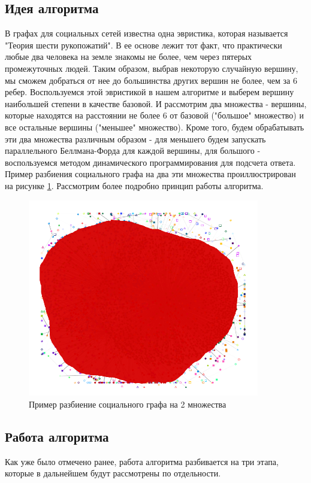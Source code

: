 \FloatBarrier
\subsection{Идея алгоритма}
В графах для социальных сетей известна одна эвристика, которая называется "Теория шести рукопожатий". В ее основе лежит тот факт, что практически любые два человека на земле знакомы не более, чем через пятерых промежуточных людей. Таким образом, выбрав некоторую случайную вершину, мы сможем добраться от нее до большинства других вершин не более, чем за 6 ребер. Воспользуемся этой эвристикой в нашем алгоритме и выберем вершину наибольшей степени в качестве базовой. И рассмотрим два множества - вершины, которые находятся на расстоянии не более 6 от базовой ("большое" множество) и все остальные вершины ("меньшее" множество). Кроме того, будем обрабатывать эти два множества различным образом - для меньшего будем запускать параллельного Беллмана-Форда для каждой вершины, для большого - воспользуемся методом динамического программирования для подсчета ответа. Пример разбиения социального графа на два эти множества проиллюстрирован на рисунке \ref{floyd_social}. Рассмотрим более подробно принцип работы алгоритма.

\begin{figure}[h]
\caption{Пример разбиение социального графа на 2 множества}
\label {floyd_social}
\centering
\includegraphics[width=0.9\textwidth]{img/floyd_social.png}
\end{figure}
\FloatBarrier

\FloatBarrier
\subsection{Работа алгоритма}
Как уже было отмечено ранее, работа алгоритма разбивается на три этапа, которые в дальнейшем будут рассмотрены по отдельности.

